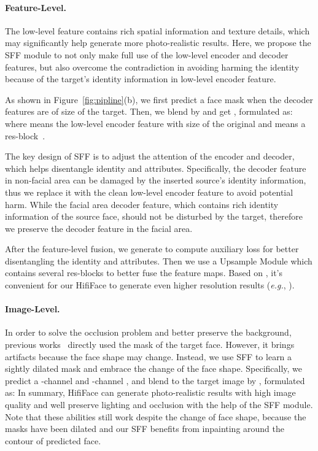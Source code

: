 \documentclass{article}
\begin{document}
\paragraph{Feature-Level.} 
The low-level feature contains rich spatial information and texture details, which may significantly help generate more photo-realistic results.
Here, we propose the SFF module to not only make full use of the low-level encoder and decoder features, but also overcome the contradiction in avoiding harming the identity because of the target's identity information in low-level encoder feature.

As shown in Figure~\ref{fig:pipline}(b), we first predict a face mask  when the decoder features  are of size  of the target. Then, we blend  by  and get , formulated as:
where  means the low-level encoder feature with  size of the original and  means a res-block~\cite{he2016deep}.

The key design of SFF is to adjust the attention of the encoder and decoder, which helps disentangle identity and attributes.
Specifically, the decoder feature in non-facial area can be damaged by the inserted source's identity information, thus we replace it with the clean low-level encoder feature to avoid potential harm.
While the facial area decoder feature, which contains rich identity information of the source face, should not be disturbed by the target, therefore we preserve the decoder feature in the facial area. 

After the feature-level fusion, we generate  to compute auxiliary loss for better disentangling the identity and attributes. Then we use a  Upsample Module  which contains several res-blocks to better fuse the feature maps. Based on , it's convenient for our HifiFace to generate even higher resolution results (\textit{e.g.}, ).



\paragraph{Image-Level.}  In order to solve the occlusion problem and better preserve the background, previous works~\cite{Nirkin2019fsgan,natsume2018fsnet} directly used the mask of the target face. 
However, it brings artifacts because the face shape may change.
Instead, we use SFF to learn a sightly dilated mask and embrace the change of the face shape.  
Specifically, we predict a -channel  and -channel , and blend  to the target image by , formulated as:
In summary, HifiFace can generate photo-realistic results with high image quality and well preserve lighting and occlusion with the help of the SFF module. 
Note that these abilities still work despite the change of face shape, because the masks have been dilated and our SFF benefits from inpainting around the contour of predicted face. 
\end{document}
